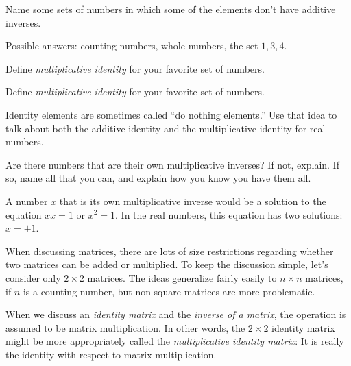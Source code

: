 \documentclass{ximera}
\begin{document}
\begin{question}
Name some sets of numbers in which some of the elements don't have
additive inverses.
\begin{freeResponse}
Possible answers: counting numbers, whole numbers, the set ${1, 3,
  4}$.
\end{freeResponse}
\end{question}

\begin{question}Define \emph{multiplicative identity} for your favorite set of numbers.  
\begin{freeResponse}
\end{freeResponse}
\end{question}

\begin{question}Define \emph{multiplicative identity} for your favorite set of numbers.  
\begin{freeResponse}
\end{freeResponse}
\end{question}

\begin{question}Identity elements are sometimes called ``do nothing elements.''  Use that idea to talk about both the additive identity and the multiplicative identity for real numbers.  
\begin{freeResponse}
\end{freeResponse}
\end{question}

\begin{question}
Are there numbers that are their own multiplicative inverses?  If not, explain.  If so, name all that you can, and explain how you know you have them all.
\begin{freeResponse}
A number $x$ that is its own multiplicative inverse would be a solution to the equation $x\dot x=1$ or $x^2=1$.  In the real numbers, this equation has two solutions:  $x = \pm 1$.  
\end{freeResponse}
\end{question}

When discussing matrices, there are lots of size restrictions
regarding whether two matrices can be added or multiplied.  To keep
the discussion simple, let's consider only $2\times 2$ matrices.  The
ideas generalize fairly easily to $n\times n$ matrices, if $n$ is a
counting number, but non-square matrices are more problematic.

When we discuss an \emph{identity matrix} and the \emph{inverse of a
  matrix}, the operation is assumed to be matrix multiplication.  In
other words, the $2\times 2$ identity matrix might be more
appropriately called the \emph{multiplicative identity matrix}: It is
really the identity with respect to matrix multiplication.
\end{document}
